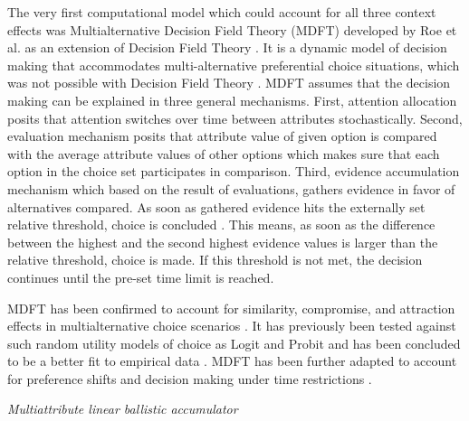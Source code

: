 \documentclass[a4paper,12pt]{article}
\newcommand{\citeyearonly}[1]{\citeyearpar{#1}}
\begin{document}
The very first computational model which could account for all three context effects was Multialternative Decision Field Theory (MDFT) developed by Roe et al. \citeyearonly{roe2001multialternative} as an extension of Decision Field Theory \citep{busemeyer1993decision}. It is a dynamic model of decision making that accommodates multi-alternative preferential choice situations, which was not possible with Decision Field Theory \citep{hotaling2019quantitative}. MDFT assumes that the decision making can be explained in three general mechanisms. First, attention allocation posits that attention switches over time between attributes stochastically. Second, evaluation mechanism posits that attribute value of given option is compared with the average attribute values of other options  which makes sure that each option in the choice set participates in comparison. Third, evidence accumulation mechanism which based on the result of evaluations, gathers evidence in favor of alternatives compared. As soon as gathered evidence hits the externally set relative threshold, choice is concluded \citep{busemeyer2002survey}. This means, as soon as the difference between the highest and the second highest evidence values is larger than the relative threshold, choice is made. If this threshold is not met, the decision continues until the pre-set time limit is reached.

MDFT has been confirmed to account for similarity, compromise, and attraction effects in multialternative choice scenarios \citep{roe2001multialternative}. It has previously been tested against such random utility models of choice as Logit and Probit and has been concluded to be a better fit to empirical data \citep{berkowitsch2014rigorously}. 
MDFT has been further adapted to account for preference shifts \citep{mohr2017attraction} and decision making under time restrictions \citep{diederich2003mdft}.

\textit{Multiattribute linear ballistic accumulator}
\end{document}
